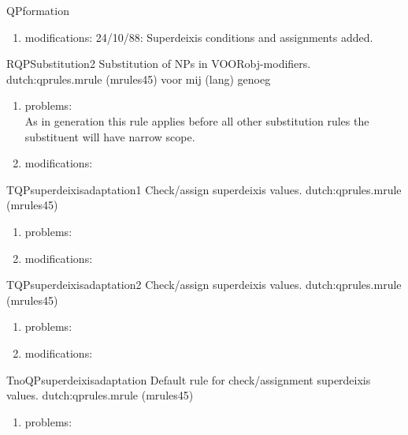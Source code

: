 \begin{mruleclass}{QPformation}
\begin{members}
\begin{member}
\begin{enumerate}
\item modifications:
24/10/88: Superdeixis conditions and assignments added. \\

\end{enumerate}

\end{member}
\begin{member}
 RQPSubstitution2
 Substitution of NPs in VOORobj-modifiers.
\file dutch:qprules.mrule (mrules45)
\semantics \nosemantics
\example voor mij (lang) genoeg
\remarks\mbox{}
\begin{enumerate}
\item problems:\\ As in generation this rule applies before all other 
substitution rules the substituent will have narrow scope.

\item modifications:

\end{enumerate}

\end{member}
\begin{member}
 TQPsuperdeixisadaptation1
 Check/assign superdeixis values.
\file dutch:qprules.mrule (mrules45)
\semantics \nosemantics
\example
\remarks\mbox{}
\begin{enumerate}
\item problems:\\

\item modifications:\\

\end{enumerate}

\end{member}
\begin{member}
 TQPsuperdeixisadaptation2
 Check/assign superdeixis values.
\file dutch:qprules.mrule (mrules45)
\semantics \nosemantics
\example
\remarks\mbox{}
\begin{enumerate}
\item problems:\\

\item modifications:\\

\end{enumerate}

\end{member}
\begin{member}
 TnoQPsuperdeixisadaptation
 Default rule for check/assignment superdeixis values.
\file dutch:qprules.mrule (mrules45)
\semantics \nosemantics
\example
\remarks\mbox{}
\begin{enumerate}
\item problems:\\


\end{enumerate}
\end{member}
\end{members}
\end{mruleclass}
